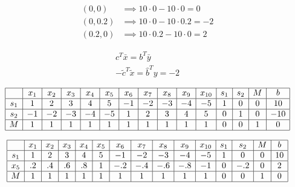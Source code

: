 \documentclass{article}
\begin{document}
\begin{equation}
    \begin{array}{ll}
        (0,0) & \implies 10 \cdot 0 - 10 \cdot 0 = 0 \\
        (0,0.2) & \implies 10 \cdot 0 - 10 \cdot 0.2 = -2 \\
        (0.2,0) & \implies 10 \cdot 0.2 - 10 \cdot 0 = 2
    \end{array}
\end{equation}

\begin{equation}
    \begin{array}{c}
        c^T\bar{x} = b^T\bar{y} \\
        -\tilde{c}^T\tilde{x} = \hat{b}^Ty = -2
    \end{array}
\end{equation}

\begin{equation}
    \begin{array}{|c|c|c|c|c|c|c|c|c|c|c|c|c|c|c|}
        \hline
        & x_1 & x_2 & x_3 & x_4 & x_5 & x_6 & x_7 & x_8 & x_9 & x_{10} & s_1 & s_2 & M & b \\
        \hline
        s_1 & 1 & 2 & 3 & 4 & 5 & -1 & -2 & -3 & -4 & -5 & 1 & 0 & 0 & 10 \\
        \hline
        s_2 & -1 & -2 & -3 & -4 & -5 & 1 & 2 & 3 & 4 & 5 & 0 & 1 & 0 & -10 \\
        \hline
        M & 1 & 1 & 1 & 1 & 1 & 1 & 1 & 1 & 1 & 1 & 0 & 0 & 1 & 0 \\
        \hline
    \end{array}
\end{equation}

\begin{equation}
    \begin{array}{|c|c|c|c|c|c|c|c|c|c|c|c|c|c|c|}
        \hline
        & x_1 & x_2 & x_3 & x_4 & x_5 & x_6 & x_7 & x_8 & x_9 & x_{10} & s_1 & s_2 & M & b \\
        \hline
        s_1 & 1 & 2 & 3 & 4 & 5 & -1 & -2 & -3 & -4 & -5 & 1 & 0 & 0 & 10 \\
        \hline
        x_5 & .2 & .4 & .6 & .8 & 1 & -.2 & -.4 & -.6 & -.8 & -1 & 0 & -.2 & 0 & 2 \\
        \hline
        M & 1 & 1 & 1 & 1 & 1 & 1 & 1 & 1 & 1 & 1 & 0 & 0 & 1 & 0 \\
        \hline
    \end{array}
\end{equation}
\end{document}
